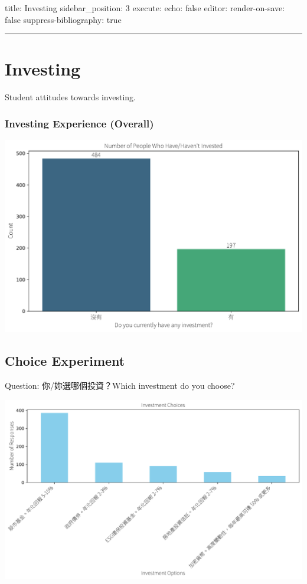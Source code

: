 \documentclass[
  letterpaper,
  DIV=11,
  numbers=noendperiod]{scrartcl}
\begin{document}
title: Investing sidebar\_position: 3 execute: echo: false editor:
render-on-save: false suppress-bibliography: true

\begin{center}\rule{0.5\linewidth}{0.5pt}\end{center}

\section{Investing}\label{investing-1}

Student attitudes towards investing.

\subsubsection{Investing Experience
(Overall)}\label{investing-experience-overall}

\includegraphics{_thesis_files/figure-pdf/cell-21-output-1.pdf}

\subsection{Choice Experiment}\label{choice-experiment}

Question: 你/妳選哪個投資？Which investment do you choose?

\includegraphics{_thesis_files/figure-pdf/cell-22-output-1.pdf}
\end{document}
